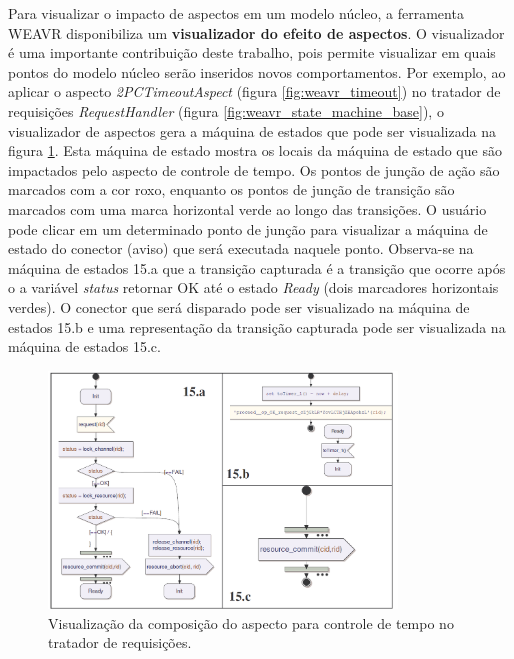 Para visualizar o impacto de aspectos em um modelo núcleo, a ferramenta WEAVR disponibiliza um \textbf{visualizador do efeito de aspectos}. O
visualizador é uma importante contribuição deste trabalho, pois permite visualizar em quais pontos do modelo núcleo serão inseridos novos
comportamentos. Por exemplo, ao aplicar o aspecto \textit{2PCTimeoutAspect} (figura \ref{fig:weavr_timeout}) no tratador de requisições \textit{RequestHandler} 
(figura \ref{fig:weavr_state_machine_base}), o visualizador de aspectos gera a máquina de estados que pode ser visualizada na figura
\ref{fig:weavr_composed}. Esta máquina de estado mostra os locais da máquina de estado que são impactados pelo aspecto de controle de tempo. 
Os pontos de junção de ação são marcados com a cor roxo, enquanto os pontos de junção de transição são marcados com uma marca horizontal verde ao
longo das transições. O usuário pode clicar em um determinado ponto de junção para visualizar a máquina de estado do conector (aviso) que será executada 
naquele ponto. Observa-se na máquina de estados 15.a que a transição capturada é a transição que ocorre após o a variável \textit{status} retornar OK
até o estado \textit{Ready} (dois marcadores horizontais verdes). O conector que será disparado pode ser visualizado na máquina de estados 15.b e 
uma representação da transição capturada pode ser visualizada na máquina de estados 15.c.

\begin{figure}
	\centering
	\includegraphics[width=350px]{img/weavr_composed.png}
	\caption{Visualização da composição do aspecto
	para controle de tempo no tratador de requisições.}\label{fig:weavr_composed}
\end{figure}

